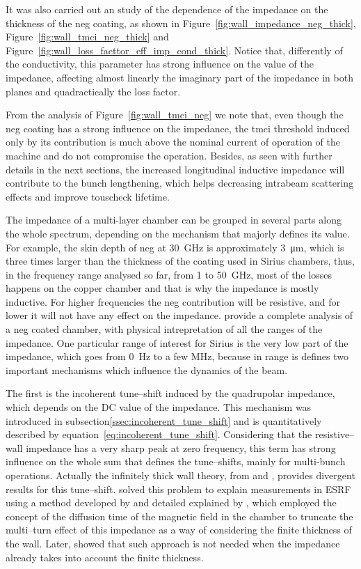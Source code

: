     It was also carried out an study of the dependence of the impedance on the thickness of the \gls{neg} coating, as shown in Figure~\ref{fig:wall_impedance_neg_thick}, Figure~\ref{fig:wall_tmci_neg_thick} and Figure~\ref{fig:wall_loss_facttor_eff_imp_cond_thick}. Notice that, differently of the conductivity, this parameter has strong influence on the value of the impedance, affecting almost linearly the imaginary part of the impedance in both planes and quadractically the loss factor.

    From the analysis of Figure~\ref{fig:wall_tmci_neg} we note that, even though the \gls{neg} coating has a strong influence on the impedance, the \gls{tmci} threshold induced only by its contribution is much above the nominal current of operation of the machine and do not compromise the operation. Besides, as seen with further details in the next sections, the increased longitudinal inductive impedance will contribute to the bunch lengthening, which helps decreasing intrabeam scattering effects and improve touscheck lifetime.

    The impedance of a multi-layer chamber can be grouped in several parts along the whole spectrum, depending on the mechanism that majorly defines its value. For example, the skin depth of \gls{neg} at \SI{30}{\giga\hertz} is approximately \SI{3}{\micro\meter}, which is three times larger than the thickness of the coating used in Sirius chambers, thus, in the frequency range analysed so far, from \SI{1}{} to \SI{50}{\giga\hertz}, most of the losses happens on the copper chamber and that is why the impedance is mostly inductive. For higher frequencies the \gls{neg} contribution will be resistive, and for lower it will not have any effect on the impedance.  provide a complete analysis of a \gls{neg} coated chamber, with physical intrepretation of all the ranges of the impedance. One particular range of interest for Sirius is the very low part of the impedance, which goes from \SI{0}{\hertz} to a few \si{\mega\hertz}, because in range is defines two important mechanisms which influence the dynamics of the beam.

    The first is the incoherent tune--shift induced by the quadrupolar impedance, which depends on the DC value of the impedance. This mechanism was introduced in subsection\ref{ssec:incoherent_tune_shift} and is quantitatively described by equation~\eqref{eq:incoherent_tune_shift}. Considering that the resistive--wall impedance has a very sharp peak at zero frequency, this term has strong influence on the whole sum that defines the tune--shifts, mainly for multi-bunch operations. Actually the infinitely thick wall theory, from  and \cite{Yokoya1993}, provides divergent results for this tune--shift.  solved this problem to explain measurements in ESRF using a method developed by  and detailed explained by , which employed the concept of the diffusion time of the magnetic field in the chamber to truncate the multi--turn effect of this impedance as a way of considering the finite thickness of the wall. Later,  showed that such approach is not needed when the impedance already takes into account the finite thickness.

